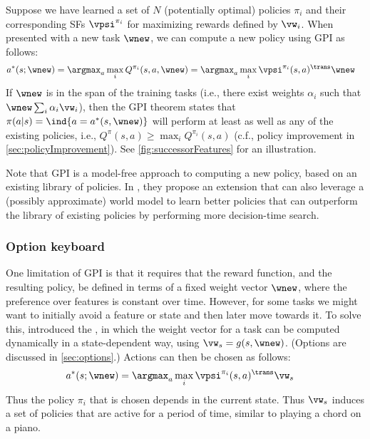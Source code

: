 Suppose we have learned a set of $N$ (potentially optimal)
policies $\pi_i$ and their corresponding SFs $\vpsi^{\pi_i}$
for maximizing rewards defined by $\vw_i$.
When presented with a new task $\wnew$,
we can compute a new policy using GPI as follows:
\begin{align}
  a^*(s;\wnew) &=
  \argmax_a \max_i Q^{\pi_i}(s,a,\wnew)
  =\argmax_a \max_i \vpsi^{\pi_i}(s,a)^\trans \wnew
\end{align}
If $\wnew$ is in the span of the training tasks
(i.e., there exist weights $\alpha_i$ such that $\wnew \sum_i \alpha_i \vw_i$),
then the GPI theorem states that $\pi(a|s)=\ind{a=a^*(s,\wnew)}$
will perform at least as well as any of the existing policies,
i.e., $Q^{\pi}(s,a) \geq \max_i Q^{\pi_i}(s,a)$
(c.f.,  policy improvement in \cref{sec:policyImprovement}).
See \cref{fig:successorFeatures} for an illustration.

Note that GPI is a model-free approach to computing a new policy,
based on an existing library of policies.
In \citep{Alegre2023}, they propose an extension that can also
leverage a (possibly approximate) world model to learn
better policies that can outperform the library
of existing policies by performing more decision-time search.


\subsubsection{Option keyboard}

One limitation of GPI is that it requires that the reward
function, and the resulting policy, be defined in terms of a fixed
weight vector $\wnew$, where the preference over features
is constant over time. However, for some tasks we might
want to initially avoid a feature or state and then later move
towards it.
To solve this, 
\citep{Barreto2019,Barreto2020} introduced the ,
in which the weight vector for a task can be computed
dynamically in a state-dependent way, using
$\vw_s = g(s,\wnew)$.
(Options are discussed in \cref{sec:options}.)
Actions can then be chosen as follows:
\begin{align}
  a^*(s;\wnew) &=
    \argmax_a \max_i \vpsi^{\pi_i}(s,a)^\trans \vw_s
\end{align}
Thus the policy $\pi_i$ that is chosen  depends
in the current state. Thus $\vw_s$ induces a set of policies
that are active for a period of time, similar to playing
a chord on a piano.





